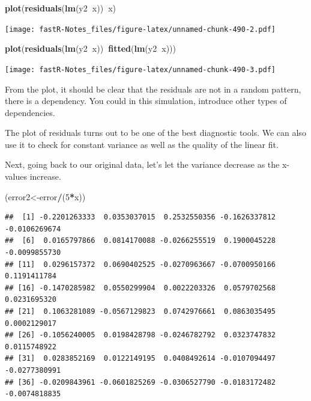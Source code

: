 \documentclass[]{book}
\newenvironment{Shaded}{\begin{snugshade}}{\end{snugshade}}
\newcommand{\KeywordTok}[1]{\textcolor[rgb]{0.13,0.29,0.53}{\textbf{#1}}}
\newcommand{\DecValTok}[1]{\textcolor[rgb]{0.00,0.00,0.81}{#1}}
\newcommand{\OperatorTok}[1]{\textcolor[rgb]{0.81,0.36,0.00}{\textbf{#1}}}
\newcommand{\NormalTok}[1]{#1}
\theoremstyle{definition}
\theoremstyle{definition}
\theoremstyle{definition}
\theoremstyle{remark}
\begin{document}
\begin{Shaded}
\begin{Highlighting}[]
\KeywordTok{plot}\NormalTok{(}\KeywordTok{residuals}\NormalTok{(}\KeywordTok{lm}\NormalTok{(y2}\OperatorTok{~}\NormalTok{x))}\OperatorTok{~}\NormalTok{x)}
\end{Highlighting}
\end{Shaded}

\texttt{[image: fastR-Notes\_files/figure-latex/unnamed-chunk-490-2.pdf]}

\begin{Shaded}
\begin{Highlighting}[]
\KeywordTok{plot}\NormalTok{(}\KeywordTok{residuals}\NormalTok{(}\KeywordTok{lm}\NormalTok{(y2}\OperatorTok{~}\NormalTok{x))}\OperatorTok{~}\KeywordTok{fitted}\NormalTok{(}\KeywordTok{lm}\NormalTok{(y2}\OperatorTok{~}\NormalTok{x)))}
\end{Highlighting}
\end{Shaded}

\texttt{[image: fastR-Notes\_files/figure-latex/unnamed-chunk-490-3.pdf]}

From the plot, it should be clear that the residuals are not in a random
pattern, there is a dependency. You could in this simulation, introduce
other types of dependencies.

The plot of residuals turns out to be one of the best diagnostic tools.
We can also use it to check for constant variance as well as the quality
of the linear fit.

Next, going back to our original data, let's let the variance decrease
as the x-values increase.

\begin{Shaded}
\begin{Highlighting}[]
\NormalTok{(error2<-error}\OperatorTok{/}\NormalTok{(}\DecValTok{5}\OperatorTok{*}\NormalTok{x))}
\end{Highlighting}
\end{Shaded}

\begin{verbatim}
##  [1] -0.2201263333  0.0353037015  0.2532550356 -0.1626337812 -0.0106269674
##  [6]  0.0165797866  0.0814170088 -0.0266255519  0.1900045228 -0.0099855730
## [11]  0.0296157372  0.0690402525 -0.0270963667 -0.0700950166  0.1191411784
## [16] -0.1470285982  0.0550299904  0.0022203326  0.0579702568  0.0231695320
## [21]  0.1063281089 -0.0567129823  0.0742976661  0.0863035495  0.0002129017
## [26] -0.1056240005  0.0198428798 -0.0246782792  0.0323747832  0.0115748922
## [31]  0.0283852169  0.0122149195  0.0408492614 -0.0107094497 -0.0277380991
## [36] -0.0209843961 -0.0601825269 -0.0306527790 -0.0183172482 -0.0074818835
\end{verbatim}
\end{document}
